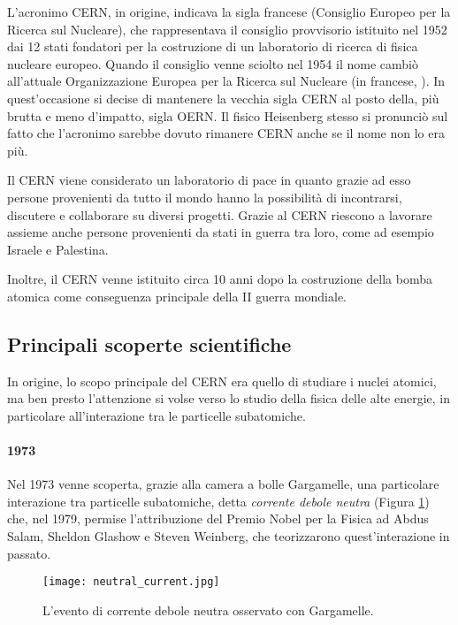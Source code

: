 		L'acronimo \ac{CERN}, in origine, indicava la sigla francese \emph{} (Consiglio Europeo per la Ricerca sul Nucleare), che rappresentava il consiglio provvisorio istituito nel 1952 dai 12 stati fondatori per la costruzione di un laboratorio di ricerca di fisica nucleare europeo. Quando il consiglio venne sciolto nel 1954 il nome cambiò all'attuale Organizzazione Europea per la Ricerca sul Nucleare (in francese, \emph{}). In quest'occasione si decise di mantenere la vecchia sigla \ac{CERN} al posto della, più brutta e meno d'impatto, sigla \ac{OERN}. Il fisico Heisenberg stesso si pronunciò sul fatto che l'acronimo sarebbe dovuto rimanere \ac{CERN} anche se il nome non lo era più.
		
		Il \ac{CERN} viene considerato un laboratorio di pace in quanto grazie ad esso persone provenienti da tutto il mondo hanno la possibilità di incontrarsi, discutere e collaborare su diversi progetti. Grazie al \ac{CERN} riescono a lavorare assieme anche persone provenienti da stati in guerra tra loro, come ad esempio Israele e Palestina.
		
		Inoltre, il \ac{CERN} venne istituito circa 10 anni dopo la costruzione della bomba atomica come conseguenza principale della II guerra mondiale.
		
		\subsection{Principali scoperte scientifiche} \label{subsec:C;s;principali_scoperte_scientifiche}
		
			In origine, lo scopo principale del \ac{CERN} era quello di studiare i nuclei atomici, ma ben presto l'attenzione si volse verso lo studio della fisica delle alte energie, in particolare all'interazione tra le particelle subatomiche.
			
			\paragraph{1973}Nel 1973 venne scoperta, grazie alla camera a bolle Gargamelle, una particolare interazione tra particelle subatomiche, detta \textit{corrente debole neutra} (Figura \ref{fig:corrente_debole_neutra}) che, nel 1979, permise l'attribuzione del Premio Nobel per la Fisica ad Abdus Salam, Sheldon Glashow e Steven Weinberg, che teorizzarono quest'interazione in passato.
			
			\begin{figure}[h!]
				\begin{center}
					\texttt{[image: neutral\_current.jpg]}
				\end{center}
				\caption[Corrente debole neutra]{L'evento di corrente debole neutra osservato con Gargamelle.}
				\label{fig:corrente_debole_neutra}
			\end{figure}
			
